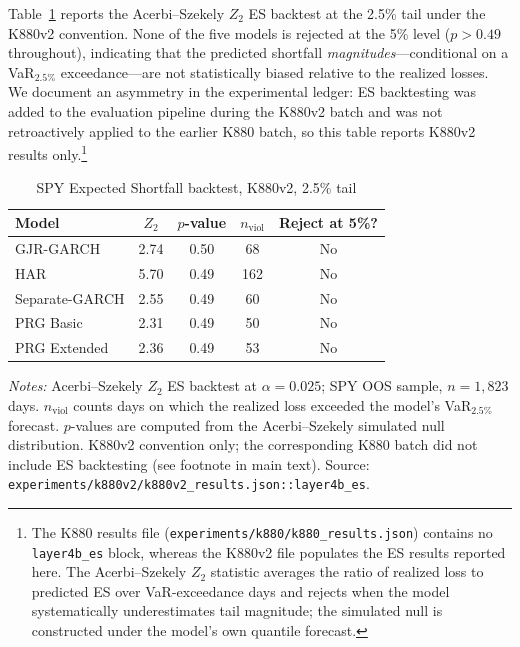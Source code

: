 \documentclass[11pt,a4paper]{article}
\begin{document}
Table~\ref{app:tab:es_k880v2} reports the Acerbi--Szekely
\citeyearpar{Acerbi2014} $Z_2$ ES backtest at the 2.5\% tail under the
K880v2 convention. None of the five models is rejected at the 5\% level
($p > 0.49$ throughout), indicating that the predicted shortfall
\emph{magnitudes}---conditional on a VaR$_{2.5\%}$ exceedance---are not
statistically biased relative to the realized losses. We document an
asymmetry in the experimental ledger: ES backtesting was added to the
evaluation pipeline during the K880v2 batch and was not retroactively
applied to the earlier K880 batch, so this table reports K880v2 results
only.\footnote{The K880 results file (\texttt{experiments/k880/k880\_results.json})
contains no \texttt{layer4b\_es} block, whereas the K880v2 file
populates the ES results reported here. The Acerbi--Szekely $Z_2$
statistic averages the ratio of realized loss to predicted ES over
VaR-exceedance days and rejects when the model systematically
underestimates tail magnitude; the simulated null is constructed under
the model's own quantile forecast.}

\begin{table}[htbp]
\centering
\caption{SPY Expected Shortfall backtest, K880v2, 2.5\% tail}
\label{app:tab:es_k880v2}
\small
\begin{tabular}{lcccc}
\toprule
Model & $Z_2$ & $p$-value & $n_{\text{viol}}$ & Reject at 5\%? \\
\midrule
GJR-GARCH      & 2.74 & 0.50 & 68  & No \\
HAR            & 5.70 & 0.49 & 162 & No \\
Separate-GARCH & 2.55 & 0.49 & 60  & No \\
PRG Basic      & 2.31 & 0.49 & 50  & No \\
PRG Extended   & 2.36 & 0.49 & 53  & No \\
\bottomrule
\end{tabular}
\begin{flushleft}
\footnotesize
\emph{Notes:} Acerbi--Szekely $Z_2$ ES backtest at $\alpha = 0.025$;
SPY OOS sample, $n = 1{,}823$ days. $n_{\text{viol}}$ counts days on
which the realized loss exceeded the model's VaR$_{2.5\%}$ forecast.
$p$-values are computed from the Acerbi--Szekely simulated null
distribution. K880v2 convention only; the corresponding K880 batch did
not include ES backtesting (see footnote in main text).
Source: \texttt{experiments/k880v2/k880v2\_results.json::layer4b\_es}.
\end{flushleft}
\end{table}
\end{document}
